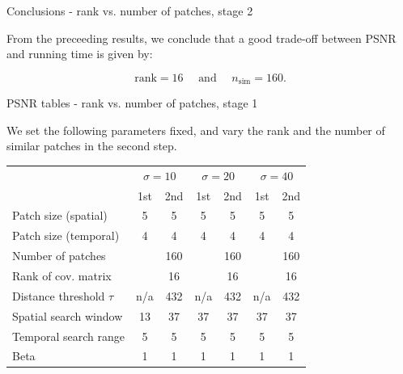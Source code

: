 \documentclass[mathserif, 8pt]{beamer}
\begin{document}
\begin{frame}{Conclusions - rank vs. number of patches, stage 2}

	From the preceeding results, we conclude that a good trade-off between PSNR and running time
	is given by:

	\[\text{rank} = 16 \quad\text{ and }\quad n_{\text{sim}} = 160.\]

\end{frame}

\begin{frame}{PSNR tables - rank vs. number of patches, stage 1}

	We set the following parameters fixed, and vary the rank and the number of similar
	patches in the second step.

	\begin{center}
	\begin{tabular}{l | c c | c c | c c }
		& \multicolumn{2}{c|}{$\sigma = 10$} 
		& \multicolumn{2}{c|}{$\sigma = 20$} 
		& \multicolumn{2}{c}{$\sigma = 40$} \\
		                            & 1st  & 2nd  & 1st  & 2nd  & 1st  & 2nd \\\hline\hline
		Patch size (spatial)        &  5   &   5  &  5   &   5  &  5   &   5 \\
		Patch size (temporal)       &  4   &   4  &  4   &   4  &  4   &   4 \\
		Number of patches           &      & 160  &      & 160  &      & 160 \\
		Rank of cov. matrix         &      &  16  &      &  16  &      & 16  \\
		Distance threshold $\tau$   & n/a  & 432  & n/a  & 432  & n/a  & 432 \\
		Spatial search window       & 13   & 37   & 37   & 37   & 37   & 37  \\
		Temporal search range       & 5    & 5    & 5    & 5    & 5    & 5   \\\hline
		Beta                        & 1    & 1    & 1    & 1    & 1    & 1   \\\hline
	\end{tabular}
	\end{center}

	\bigskip


\end{frame}
\end{document}
